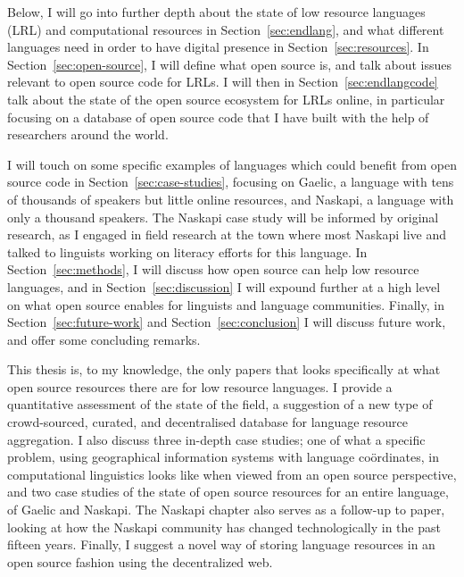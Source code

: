 Below, I will go into further depth about the state of low resource languages (LRL) and computational resources in Section~\ref{sec:endlang}, and what different languages need in order to have digital presence in Section~\ref{sec:resources}. In Section~\ref{sec:open-source}, I will define what open source is, and talk about issues relevant to open source code for LRLs. I will then in Section~\ref{sec:endlangcode} talk about the state of the open source ecosystem for LRLs online, in particular focusing on a database of open source code that I have built with the help of researchers around the world.

I will touch on some specific examples of languages which could benefit from open source code in Section~\ref{sec:case-studies}, focusing on Gaelic, a language with tens of thousands of speakers but little online resources, and Naskapi, a language with only a thousand speakers. The Naskapi case study will be informed by original research, as I engaged in field research at the town where most Naskapi live and talked to linguists working on literacy efforts for this language. In Section~\ref{sec:methods}, I will discuss how open source can help low resource languages, and in Section~\ref{sec:discussion} I will expound further at a high level on what open source enables for linguists and language communities. Finally, in Section~\ref{sec:future-work} and Section~\ref{sec:conclusion} I will discuss future work, and offer some concluding remarks.

This thesis is, to my knowledge, the only papers that looks specifically at what open source resources there are for low resource languages. I provide a quantitative assessment of the state of the field, a suggestion of a new type of crowd-sourced, curated, and decentralised database for language resource aggregation. I also discuss three in-depth case studies; one of what a specific problem, using geographical information systems with language co\"{o}rdinates, in computational linguistics looks like when viewed from an open source perspective, and two case studies of the state of open source resources for an entire language, of Gaelic and Naskapi. The Naskapi chapter also serves as a follow-up to  paper, looking at how the Naskapi community has changed technologically in the past fifteen years. Finally, I suggest a novel way of storing language resources in an open source fashion using the decentralized web.
